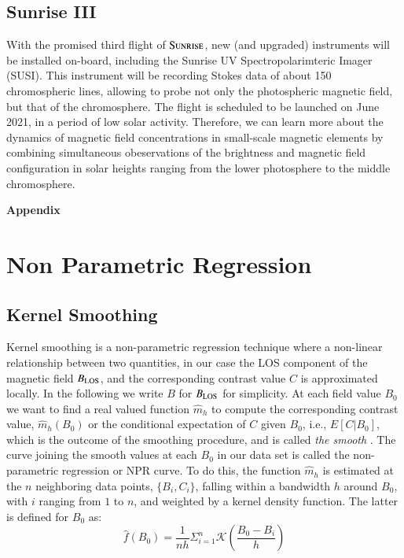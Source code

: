\documentclass[goettingen, gauss, print]{thesis}
\begin{document}
\section{Sunrise III} 
With the promised third flight of $\textsc{Sunrise}$, new (and upgraded) instruments will be installed on-board, including the Sunrise UV Spectropolarimteric Imager (SUSI). This instrument will be recording Stokes data of about 150 chromospheric lines, allowing to probe not only the photospheric magnetic field, but that of the chromosphere. The flight is scheduled to be launched on June 2021, in a period of low solar activity. Therefore, we can learn more about the dynamics of magnetic field concentrations in small-scale magnetic elements by combining simultaneous obeservations of the brightness and magnetic field configuration in solar heights ranging from the lower photosphere to the middle chromosphere. 





\newpage

\appendix

\thispagestyle{empty}
\vspace*{2.2cm}
{\Huge\bf Appendix}
\chapter{Non Parametric Regression}
\label{appendix_A}

\section{Kernel Smoothing}

Kernel smoothing is a non-parametric regression technique where a non-linear relationship between two quantities, in our case the LOS component of the magnetic field $B_{\rm LOS}$, and the corresponding contrast value $C$ is approximated locally. In the following we write $B$ for $B_{\rm LOS}$ for simplicity. At each field value $B_0$ we want to find a real valued function $\hat{m}_h$ to compute the corresponding contrast value, $\hat{m}_h(B_0)$ or the conditional expectation of $C$ given $B_0$, i.e., $E[C|B_0]$, which is the outcome of the smoothing procedure, and is called \textit{the smooth} \cite{tukey_exploratory_1977}. The curve joining the smooth values at each $B_0$ in our data set is called the non-parametric regression or NPR curve. To do this, the function $\hat{m}_h$ is estimated at the $n$ neighboring data points,  $\{B_i,C_i\}$, falling within a bandwidth $h$ around $B_0$, with $i$ ranging from $1$ to $n$, and weighted by a kernel density function. The latter is defined for $B_0$ as:
\begin{equation}
\hat{f}(B_0) = \frac{1}{n h} \Sigma_{i=1}^{n} \mathcal{K}(\frac{B_0-B_i}{h})
\end{equation}
\end{document}
